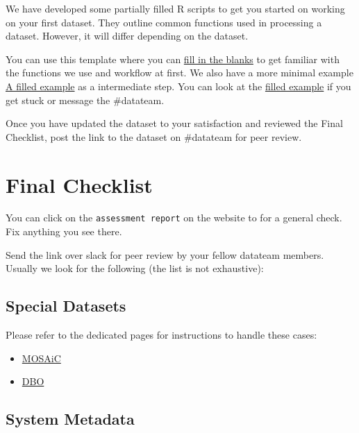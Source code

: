 \documentclass[
  letterpaper,
  DIV=11,
  numbers=noendperiod]{scrreprt}
\providecommand{\tightlist}{%
  \setlength{\itemsep}{0pt}\setlength{\parskip}{0pt}}\usepackage{longtable,booktabs,array}
\begin{document}
We have developed some partially filled R scripts to get you started on
working on your first dataset. They outline common functions used in
processing a dataset. However, it will differ depending on the dataset.

You can use this template where you can
\href{data/dataset_processing_example_blanks.R}{fill in the blanks} to
get familiar with the functions we use and workflow at first. We also
have a more minimal example
\href{data/dataset_processing_example_skeleton.R}{A filled example} as a
intermediate step. You can look at the
\href{data/dataset_processing_example_filled.R}{filled example} if you
get stuck or message the \#datateam.

Once you have updated the dataset to your satisfaction and reviewed the
Final Checklist, post the link to the dataset on \#datateam for peer
review.

\hypertarget{final-checklist}{%
\section{Final Checklist}\label{final-checklist}}

You can click on the \texttt{assessment\ report} on the website to for a
general check. Fix anything you see there.

Send the link over slack for peer review by your fellow datateam
members. Usually we look for the following (the list is not exhaustive):

\hypertarget{special-datasets}{%
\subsection{Special Datasets}\label{special-datasets}}

Please refer to the dedicated pages for instructions to handle these
cases:

\begin{itemize}
\tightlist
\item
  \href{https://nceas.github.io/datateam-training/reference/MOSAiC.html}{MOSAiC}
\item
  \href{https://nceas.github.io/datateam-training/reference/distributed-biological-observatory-dbo-submissions.html}{DBO}
\end{itemize}

\hypertarget{system-metadata}{%
\subsection{System Metadata}\label{system-metadata}}
\end{document}
